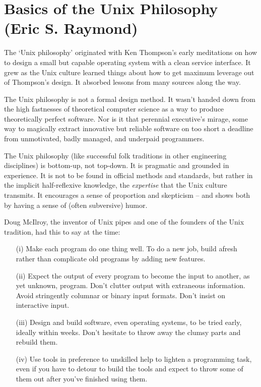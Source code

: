\documentclass[10pt,twoside,openright]{memoir}
\begin{document}
\chapter{Basics of the Unix Philosophy (Eric S. Raymond)}

The `Unix philosophy' originated with Ken Thompson's early meditations on how to design a small but capable operating system with a clean service interface. It grew as the Unix culture learned things about how to get maximum leverage out of Thompson's design. It absorbed lessons from many sources along the way.

The Unix philosophy is not a formal design method. It wasn't handed down from the high fastnesses of theoretical computer science as a way to produce theoretically perfect software. Nor is it that perennial executive's mirage, some way to magically extract innovative but reliable software on too short a deadline from unmotivated, badly managed, and underpaid programmers.

The Unix philosophy (like successful folk traditions in other engineering disciplines) is bottom-up, not top-down. It is pragmatic and grounded in experience. It is not to be found in official methods and standards, but rather in the implicit half-reflexive knowledge, the \emph{expertise} that the Unix culture transmits. It encourages a sense of proportion and skepticism -- and shows both by having a sense of (often subversive) humor.

Doug McIlroy, the inventor of Unix pipes and one of the founders of the Unix tradition, had this to say at the time:

\begin{itemize}

\item[(i)] Make each program do one thing well. To do a new job, build afresh rather than complicate old programs by adding new features.

\item[(ii)] Expect the output of every program to become the input to another, as yet unknown, program. Don't clutter output with extraneous information. Avoid stringently columnar or binary input formats. Don't insist on interactive input.

\item[(iii)] Design and build software, even operating systems, to be tried early, ideally within weeks. Don't hesitate to throw away the clumsy parts and rebuild them.

\item[(iv)] Use tools in preference to unskilled help to lighten a programming task, even if you have to detour to build the tools and expect to throw some of them out after you've finished using them.

\end{itemize}
\end{document}
